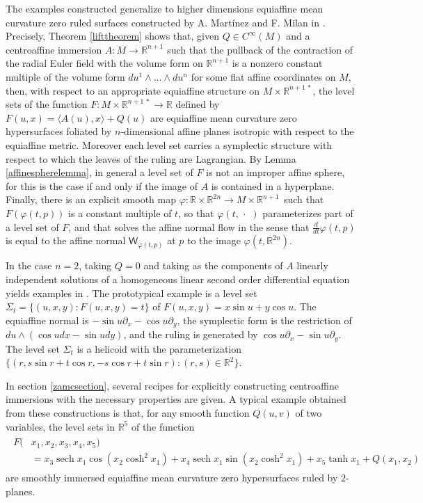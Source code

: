 \documentclass [leqno, 10pt]{amsart}
\theoremstyle{definition}
\numberwithin{equation}{section}
\newcommand{\sech}{\operatorname{sech}}
\newcommand{\dum}{\,\cdot\,\,}
\newcommand{\nm}{\mathsf{W}}
\newcommand{\cinf}{C^{\infty}}
\newcommand{\pr}{\partial}
\newcommand{\lb}{\langle}
\newcommand{\ra}{\rangle}
\newcommand{\rea}{\mathbb R}
\begin{document}
The examples constructed generalize to higher dimensions equiaffine mean curvature zero ruled surfaces constructed by A. Mart\'inez and F. Milan in \cite{Martinez-Milan}. Precisely, Theorem \ref{lifttheorem} shows that, given $Q \in \cinf(M)$ and a centroaffine immersion $A:M \to \rea^{n+1}$ such that the pullback of the contraction of the radial Euler field with the volume form on $\rea^{n+1}$ is a nonzero constant multiple of the volume form $du^{1} \wedge \dots \wedge du^{n}$ for some flat affine coordinates on $M$, then, with respect to an appropriate equiaffine structure on $M \times \rea^{n+1\,\ast}$, the level sets of the function $F:M \times \rea^{n+1\,\ast} \to \rea$ defined by $F(u, x) = \lb A(u), x\ra + Q(u)$ are equiaffine mean curvature zero hypersurfaces foliated by $n$-dimensional affine planes isotropic with respect to the equiaffine metric. Moreover each level set carries a symplectic structure with respect to which the leaves of the ruling are Lagrangian. By Lemma \ref{affinespherelemma}, in general a level set of $F$ is not an improper affine sphere, for this is the case if and only if the image of $A$ is contained in a hyperplane. Finally, there is an explicit smooth map $\varphi:\rea \times \rea^{2n} \to M \times \rea^{n+1\,}$ such that $F(\varphi(t, p))$ is a constant multiple of $t$, so that $\varphi(t,\dum)$ parameterizes part of a level set of $F$, and that solves the affine normal flow in the sense that $\tfrac{d}{dt}\varphi(t, p)$ is equal to the affine normal $\nm_{\varphi(t, p)}$ at $p$ to the image $\varphi(t,\rea^{2n})$.

In the case $n = 2$, taking $Q = 0$ and taking as the components of $A$ linearly independent solutions of a homogeneous linear second order differential equation yields examples in \cite{Martinez-Milan}. The prototypical example is a level set $\Sigma_{t} = \{(u, x, y): F(u,x , y) = t\}$ of $F(u,x,y) = x \sin u + y \cos u$. The equiaffine normal is $-\sin u \pr_{x} - \cos u \pr_{y}$, the symplectic form is the restriction of $du \wedge (\cos u dx - \sin u dy)$, and the ruling is generated by $\cos u \pr_{x} - \sin u \pr_{y}$. The level set $\Sigma_{t}$ is a helicoid with the parameterization $\{(r, s\sin r + t\cos r, -s\cos r + t \sin r):(r, s) \in \rea^{2}\}$.

In section \ref{zamcsection}, several recipes for explicitly constructing centroaffine immersions with the necessary properties are given. A typical example obtained from these constructions is that, for any smooth function $Q(u, v)$ of two variables, the level sets in $\rea^{5}$ of the function
\begin{align}\label{genhel}
\begin{split}
F(&x_{1}, x_{2}, x_{3}, x_{4}, x_{5}) \\
&= x_{3}\sech{x_{1}}\cos( x_{2}\cosh^{2}{x_{1}}) + x_{4} \sech{x_{1}} \sin( x_{2}\cosh^{2}{x_{1}}) + x_{5}\tanh{x_{1}} + Q(x_{1}, x_{2})
\end{split}
\end{align} 
are smoothly immersed equiaffine mean curvature zero hypersurfaces ruled by $2$-planes. 
\end{document}
